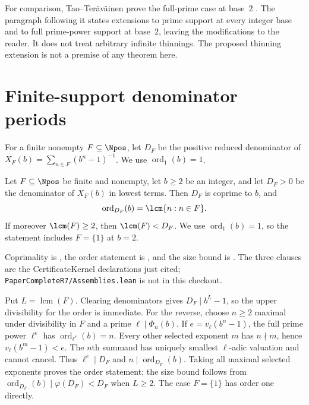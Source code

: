 \documentclass[11pt]{article}
\begin{document}
For comparison, Tao--Ter\"av\"ainen prove the full-prime case at base~$2$
\cite[Theorem~1.3, p.~4]{taoteravainen2025}.  The paragraph following it
states extensions to prime support at every integer base and to full
prime-power support at base~$2$, leaving the modifications to the reader.
It does not treat arbitrary infinite thinnings.  The proposed thinning
extension is not a premise of any theorem here.

\section{Finite-support denominator periods}\label{sec:period}

For a finite nonempty $F\subseteq\Npos$, let $D_F$ be the positive reduced
denominator of $X_F(b)=\sum_{n\in F}(b^n-1)^{-1}$.
We use $\operatorname{ord}_1(b)=1$.

\begin{theorem}\label{res:period}
Let $F\subseteq\Npos$ be finite and nonempty, let $b\ge2$ be an integer, and
let $D_F>0$ be the denominator of $X_F(b)$ in lowest terms.  Then $D_F$ is
coprime to $b$, and
\[
  \operatorname{ord}_{D_F}(b)=\lcm\{n:n\in F\}.
\]
If moreover $\lcm(F)\ge2$, then $\lcm(F)<D_F$.  We use
$\operatorname{ord}_1(b)=1$, so the statement includes $F=\{1\}$
at $b=2$.
\end{theorem}

Coprimality is
, the order statement is
, and the size bound is
.
The three clauses are the CertificateKernel declarations just cited;
\texttt{PaperCompleteR7/Assemblies.lean} is not in this checkout.

Put $L=\operatorname{lcm}(F)$.  Clearing denominators gives
$D_F\mid b^L-1$, so the upper divisibility for the order is immediate.
For the reverse, choose $n\ge2$ maximal under divisibility in $F$ and a
prime $\ell\mid\Phi_n(b)$.  If $e=v_\ell(b^n-1)$, the full prime power
$\ell^e$ has $\operatorname{ord}_{\ell^e}(b)=n$.
Every other selected exponent $m$ has $n\nmid m$, hence
$v_\ell(b^m-1)<e$.  The $n$th summand has uniquely smallest $\ell$-adic
valuation and cannot cancel.  Thus $\ell^e\mid D_F$ and
$n\mid\operatorname{ord}_{D_F}(b)$.  Taking all maximal selected exponents
proves the order statement; the size bound follows from
$\operatorname{ord}_{D_F}(b)\mid\varphi(D_F)<D_F$ when $L\ge2$.
The case $F=\{1\}$ has order one directly.
\end{document}
